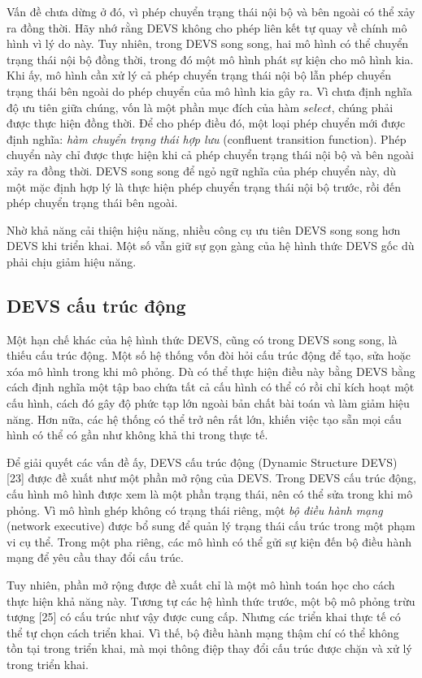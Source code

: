 Vấn đề chưa dừng ở đó, vì phép chuyển trạng thái nội bộ và bên ngoài có thể xảy ra đồng thời. Hãy nhớ rằng DEVS không cho phép liên kết tự quay về chính mô hình vì lý do này. Tuy nhiên, trong DEVS song song, hai mô hình có thể chuyển trạng thái nội bộ đồng thời, trong đó một mô hình phát sự kiện cho mô hình kia. Khi ấy, mô hình cần xử lý cả phép chuyển trạng thái nội bộ lẫn phép chuyển trạng thái bên ngoài do phép chuyển của mô hình kia gây ra. Vì chưa định nghĩa độ ưu tiên giữa chúng, vốn là một phần mục đích của hàm $select$, chúng phải được thực hiện đồng thời. Để cho phép điều đó, một loại phép chuyển mới được định nghĩa: \emph{hàm chuyển trạng thái hợp lưu} (confluent transition function). Phép chuyển này chỉ được thực hiện khi cả phép chuyển trạng thái nội bộ và bên ngoài xảy ra đồng thời. DEVS song song để ngỏ ngữ nghĩa của phép chuyển này, dù một mặc định hợp lý là thực hiện phép chuyển trạng thái nội bộ trước, rồi đến phép chuyển trạng thái bên ngoài.

Nhờ khả năng cải thiện hiệu năng, nhiều công cụ ưu tiên DEVS song song hơn DEVS khi triển khai. Một số vẫn giữ sự gọn gàng của hệ hình thức DEVS gốc dù phải chịu giảm hiệu năng.

\subsection{DEVS cấu trúc động}
Một hạn chế khác của hệ hình thức DEVS, cũng có trong DEVS song song, là thiếu cấu trúc động. Một số hệ thống vốn đòi hỏi cấu trúc động để tạo, sửa hoặc xóa mô hình trong khi mô phỏng. Dù có thể thực hiện điều này bằng DEVS bằng cách định nghĩa một tập bao chứa tất cả cấu hình có thể có rồi chỉ kích hoạt một cấu hình, cách đó gây độ phức tạp lớn ngoài bản chất bài toán và làm giảm hiệu năng. Hơn nữa, các hệ thống có thể trở nên rất lớn, khiến việc tạo sẵn mọi cấu hình có thể có gần như không khả thi trong thực tế.

Để giải quyết các vấn đề ấy, DEVS cấu trúc động (Dynamic Structure DEVS) [23] được đề xuất như một phần mở rộng của DEVS. Trong DEVS cấu trúc động, cấu hình mô hình được xem là một phần trạng thái, nên có thể sửa trong khi mô phỏng. Vì mô hình ghép không có trạng thái riêng, một \emph{bộ điều hành mạng} (network executive) được bổ sung để quản lý trạng thái cấu trúc trong một phạm vi cụ thể. Trong một pha riêng, các mô hình có thể gửi sự kiện đến bộ điều hành mạng để yêu cầu thay đổi cấu trúc.

Tuy nhiên, phần mở rộng được đề xuất chỉ là một mô hình toán học cho cách thực hiện khả năng này. Tương tự các hệ hình thức trước, một bộ mô phỏng trừu tượng [25] có cấu trúc như vậy được cung cấp. Nhưng các triển khai thực tế có thể tự chọn cách triển khai. Vì thế, bộ điều hành mạng thậm chí có thể không tồn tại trong triển khai, mà mọi thông điệp thay đổi cấu trúc được chặn và xử lý trong triển khai.

